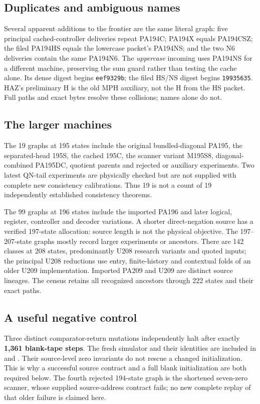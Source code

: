 \subsection{Duplicates and ambiguous names}

Several apparent additions to the frontier are the same literal graph:
five principal cached-controller deliveries repeat PA194C;
PA194X equals PA194CSZ;
the filed PA194HS equals the lowercase packet's PA194NS;
and the two N6 deliveries contain the same PA194N6.
The \emph{uppercase} incoming  uses PA194NS
for a different machine, preserving the sum guard rather than testing the
cache alone. Its dense digest begins \texttt{eef9329b}; the filed HS/NS
digest begins \texttt{19935635}. HAZ's preliminary H is the old MPH auxiliary,
not the H from the HS packet. Full paths and exact bytes resolve these
collisions; names alone do not.

\subsection{The larger machines}

The 19 graphs at 195 states include the original bundled-diagonal PA195,
the separated-head 195S, the cached 195C, the scanner variant M195S8,
diagonal-combined PA195DC, quotient parents and rejected or auxiliary
experiments. Two latest QN-tail experiments are physically checked but are
not supplied with complete new consistency calibrations. Thus 19 is not
a count of 19 independently established consistency theorems.

The 99 graphs at 196 states include the imported PA196 and later logical,
register, controller and decoder variations. A shorter direct-negation
source has a verified 197-state allocation: source length is not the
physical objective. The 197--207-state graphs mostly record larger
experiments or ancestors. There are 142 classes at 208 states, predominantly
U208 research variants and quoted inputs; the principal U208 reductions use
entry, finite-history and contextual folds of an older U209 implementation.
Imported PA209 and U209 are distinct source lineages. The census retains
all recognized ancestors through 222 states and their exact paths.

\subsection{A useful negative control}

Three distinct comparator-return mutations independently halt after exactly
\textbf{1,361 blank-tape steps}. The fresh simulator and their identities are
included in  and
. Their source-level zero invariants
do not rescue a changed initialization. This is why a successful source
contract and a full blank initialization are both required below. The fourth
rejected 194-state graph is the shortened seven-zero scanner, whose supplied
source-address contract fails; no new complete replay of that older failure
is claimed here.

